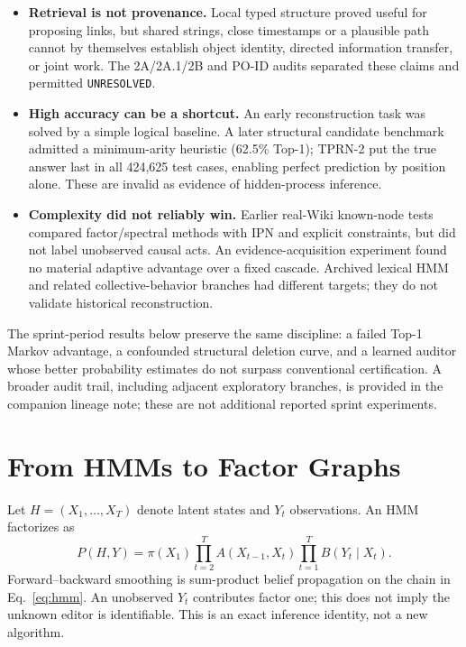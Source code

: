 \documentclass[10pt,twocolumn]{article}
\begin{document}
\begin{itemize}[leftmargin=1.2em,itemsep=1.5pt,topsep=2pt]
\item \textbf{Retrieval is not provenance.} Local typed structure proved useful for proposing links, but shared strings, close timestamps or a plausible path cannot by themselves establish object identity, directed information transfer, or joint work. The 2A/2A.1/2B and PO-ID audits separated these claims and permitted \texttt{UNRESOLVED}.
\item \textbf{High accuracy can be a shortcut.} An early reconstruction task was solved by a simple logical baseline. A later structural candidate benchmark admitted a minimum-arity heuristic (62.5\% Top-1); TPRN-2 put the true answer last in all 424,625 test cases, enabling perfect prediction by position alone. These are invalid as evidence of hidden-process inference.
\item \textbf{Complexity did not reliably win.} Earlier real-Wiki known-node tests compared factor/spectral methods with IPN and explicit constraints, but did not label unobserved causal acts. An evidence-acquisition experiment found no material adaptive advantage over a fixed cascade. Archived lexical HMM and related collective-behavior branches had different targets; they do not validate historical reconstruction.
\end{itemize}

The sprint-period results below preserve the same discipline: a failed Top-1 Markov advantage, a confounded structural deletion curve, and a learned auditor whose better probability estimates do not surpass conventional certification. A broader audit trail, including adjacent exploratory branches, is provided in the companion lineage note; these are not additional reported sprint experiments.

\section{From HMMs to Factor Graphs}
Let $H=(X_1,\ldots,X_T)$ denote latent states and $Y_t$ observations. An HMM factorizes as
\begin{equation}
P(H,Y)=\pi(X_1)\prod_{t=2}^{T}A(X_{t-1},X_t)\prod_{t=1}^{T}B(Y_t\mid X_t).
\label{eq:hmm}
\end{equation}
Forward--backward smoothing is sum-product belief propagation on the chain in Eq.~\eqref{eq:hmm}. An unobserved $Y_t$ contributes factor one; this does not imply the unknown editor is identifiable. This is an exact inference identity, not a new algorithm.
\end{document}
